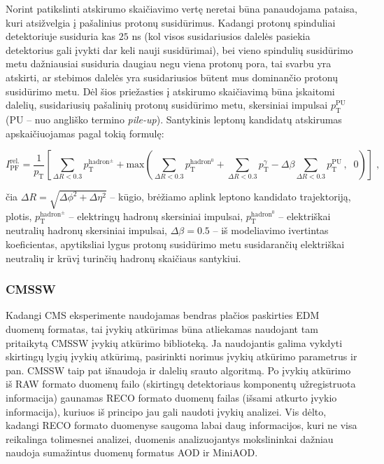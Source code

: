 \documentclass[a4paper, 12pt]{article}
\newlength\q
\begin{document}
Norint patikslinti atskirumo skaičiavimo vertę neretai būna panaudojama pataisa, kuri atsižvelgia į
pašalinius protonų susidūrimus.
Kadangi protonų spinduliai detektoriuje susiduria kas $25$ ns (kol visos susidariusios dalelės
pasiekia detektorius gali įvykti dar keli nauji susidūrimai), bei vieno spindulių susidūrimo metu
dažniausiai susiduria daugiau negu viena protonų pora, tai svarbu yra atskirti, ar stebimos dalelės
yra susidariusios būtent mus dominančio protonų susidūrimo metu.
Dėl šios priežasties į atskirumo skaičiavimą būna įskaitomi dalelių, susidariusių pašalinių
protonų susidūrimo metu, skersiniai impulsai $p_{\mathrm{T}}^{\mathrm{PU}}$ (PU -- nuo angliško
termino \textit{pile-up}).
Santykinis leptonų kandidatų atskirumas apskaičiuojamas pagal tokią formulę:

\begin{equation}
	\label{eq:isolation}
	I^{\mathrm{rel.}}_{\mathrm{PF}} = \frac{1}{p_{\mathrm{T}}} 
	\left[ \sum_{\Delta R<0.3} p_{\mathrm{T}}^{\mathrm{hadron^{\pm}}} +
	\mathrm{max} \left( \sum_{\Delta R<0.3} p_{\mathrm{T}}^{\mathrm{hadron^0}} + 
	\sum_{\Delta R<0.3} p_{\mathrm{T}}^{\gamma} -
	\Delta \beta \sum_{\Delta R<0.3} p_{\mathrm{T}}^{\mathrm{PU}}
	\, ,\;\; 0 \right) \right] \; \mathrm{,}
\end{equation}

čia $\Delta R = \sqrt{\Delta \phi^{2} + \Delta \eta^{2}}$ -- kūgio, brėžiamo aplink leptono kandidato
trajektoriją, plotis, $p_{\mathrm{T}}^{\mathrm{hadron^{\pm}}}$ -- elektringų hadronų skersiniai impulsai,
$p_{\mathrm{T}}^{\mathrm{hadron^0}}$ -- elektriškai neutralių hadronų skersiniai impulsai,
$\Delta\beta=0.5$ -- iš modeliavimo ivertintas koeficientas, apytiksliai lygus protonų susidūrimo metu
susidarančių elektriškai neutralių ir krūvį turinčių hadronų skaičiaus santykiui.


\subsubsection*{CMSSW}

Kadangi CMS eksperimente naudojamas bendras plačios paskirties EDM duomenų formatas, tai įvykių atkūrimas
būna atliekamas naudojant tam pritaikytą CMSSW įvykių atkūrimo biblioteką.
Ja naudojantis galima vykdyti skirtingų lygių įvykių atkūrimą, pasirinkti norimus įvykių atkūrimo
parametrus ir pan.
CMSSW taip pat išnaudoja ir dalelių srauto algoritmą.
Po įvykių atkūrimo iš RAW formato duomenų failo (skirtingų detektoriaus komponentų užregistruota informacija)
gaunamas RECO formato duomenų failas (išsami atkurto įvykio informacija), kuriuos iš principo
jau gali naudoti įvykių analizei.
Vis dėlto, kadangi RECO formato duomenyse saugoma labai daug informacijos, kuri ne visa reikalinga tolimesnei
analizei, duomenis analizuojantys mokslininkai dažniau naudoja sumažintus duomenų formatus AOD ir MiniAOD.
\end{document}
